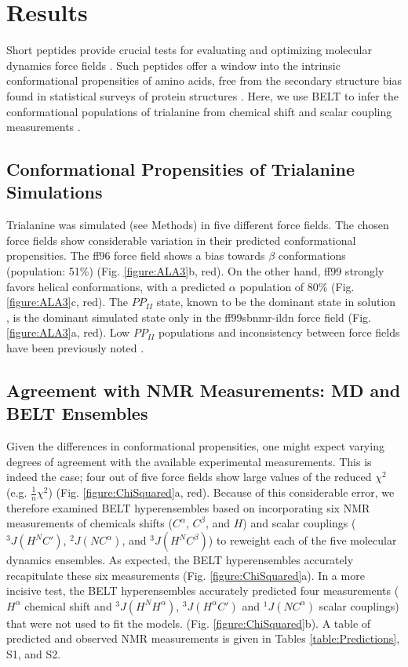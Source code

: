 \documentclass[journal=jacsat,manuscript=article]{achemso}
\begin{document}
\section*{Results}

Short peptides provide crucial tests for evaluating and optimizing molecular dynamics force fields  \cite{Graf2007,beauchamp2012protein, nerenberg2011, best2008, Grdadolnik2011}.  Such peptides offer a window into the intrinsic conformational propensities of amino acids, free from the secondary structure bias found in statistical surveys of protein structures  \cite{Jha2005}.  Here, we use BELT to infer the conformational populations of trialanine from chemical shift and scalar coupling measurements  \cite{Graf2007}.  


\subsection*{Conformational Propensities of Trialanine Simulations}

Trialanine was simulated (see Methods) in five different force fields.  The chosen force fields show considerable variation in their predicted conformational propensities.  The ff96 force field shows a bias towards $\beta$ conformations (population: 51\%) (Fig. \ref{figure:ALA3}b, red).  On the other hand, ff99 strongly favors helical conformations, with a predicted $\alpha$ population of 80\% (Fig. \ref{figure:ALA3}c, red).  The $PP_{II}$ state, known to be the dominant state in solution \cite{Grdadolnik2011, Graf2007, Avbelj2006}, is the dominant simulated state only in the ff99sbnmr-ildn force field (Fig. \ref{figure:ALA3}a, red).  Low $PP_{II}$ populations and inconsistency between force fields have been previously noted \cite{Graf2007, beauchamp2012protein, nerenberg2011, best2008}.  

\subsection*{Agreement with NMR Measurements: MD and BELT Ensembles}

Given the differences in conformational propensities, one might expect varying degrees of agreement with the available experimental measurements.  This is indeed the case; four out of five force fields show large values of the reduced $\chi^2$ (e.g. $\frac{1}{n} \chi^2$) (Fig. \ref{figure:ChiSquared}a, red).  Because of this considerable error, we therefore examined BELT hyperensembles based on incorporating six NMR measurements of chemicals shifts ($C^\alpha$, $C^\beta$, and $H$) and scalar couplings ($^3J(H^N C')$,  $^2J(N C^\alpha)$, and $^3J(H^N C^\beta)$) to reweight each of the five molecular dynamics ensembles.  As expected, the BELT hyperensembles accurately recapitulate these six measurements (Fig. \ref{figure:ChiSquared}a).  In a more incisive test, the BELT hyperensembles accurately predicted four measurements ($H^\alpha$ chemical shift and $^3J(H^N H^\alpha)$, $^3J(H^\alpha C')$ and $^1J(N C^\alpha)$ scalar couplings) that were not used to fit the models.   (Fig. \ref{figure:ChiSquared}b).  A table of predicted and observed NMR measurements is given in Tables \ref{table:Predictions}, S1, and S2.  
\end{document}
